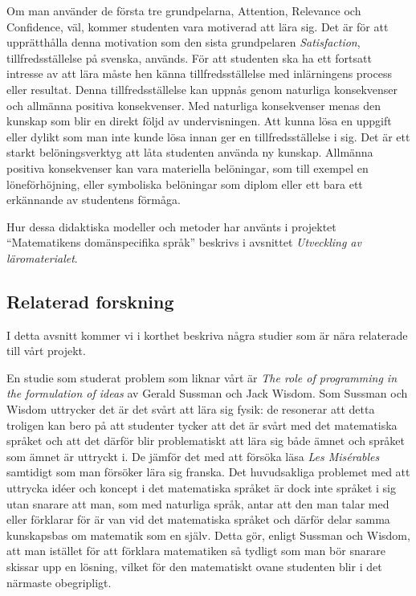 \documentclass[12pt,a4paper,twoside,openright]{article}
\begin{document}
Om man använder de första tre grundpelarna, Attention, Relevance och
Confidence, väl, kommer studenten vara motiverad att lära sig. Det är
för att upprätthålla denna motivation som den sista grundpelaren
\textit{Satisfaction}, tillfredsställelse på svenska, används. För
att studenten ska ha ett fortsatt intresse av att lära måste hen känna
tillfredsställelse med inlärningens process eller resultat. Denna
tillfredsställelse kan uppnås genom naturliga konsekvenser och
allmänna positiva konsekvenser. Med naturliga konsekvenser menas den
kunskap som blir en direkt följd av undervisningen. Att kunna lösa en
uppgift eller dylikt som man inte kunde lösa innan ger en
tillfredsställelse i sig. Det är ett starkt belöningsverktyg att låta
studenten använda ny kunskap. Allmänna positiva konsekvenser kan vara
materiella belöningar, som till exempel en löneförhöjning, eller
symboliska belöningar som diplom eller ett bara ett erkännande av
studentens förmåga.

Hur dessa didaktiska modeller och metoder har använts i projektet
``Matematikens domänspecifika språk'' beskrivs i avsnittet
\textit{Utveckling av läromaterialet}.

\subsection{Relaterad forskning}
\label{sec:relForsk}
I detta avsnitt kommer vi i korthet beskriva några studier som
är nära relaterade till vårt projekt.

En studie som studerat problem som liknar vårt är \textit{The role of
programming in the formulation of ideas} \cite{sussman2002role} av
Gerald Sussman och Jack Wisdom.
Som Sussman och Wisdom uttrycker det är det svårt att lära sig fysik:
de resonerar att detta troligen kan bero på
att studenter tycker att det är svårt med det matematiska språket och
att det därför blir problematiskt att lära sig både ämnet och språket
som ämnet är uttryckt i. De jämför det med att försöka läsa
\textit{Les Misérables} samtidigt som man försöker lära sig
franska. Det huvudsakliga problemet med att uttrycka idéer och koncept
i det matematiska språket är dock inte språket i sig utan snarare att
man, som med naturliga språk, antar att den man talar med eller
förklarar för är van vid det matematiska språket och därför delar
samma kunskapsbas om matematik som en själv. Detta gör, enligt Sussman
och Wisdom, att man istället för att förklara
matematiken så tydligt som man bör snarare skissar upp en lösning,
vilket för den matematiskt ovane studenten blir i det närmaste
obegripligt.
\end{document}
